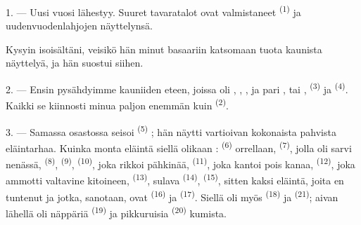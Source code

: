 %
%

\VUsaut{4.0mm}
\VUsaut{2.0mm}
\VUsaut{3.4mm}

1. --- Uusi vuosi lähestyy. Suuret tavaratalot ovat valmistaneet 
\textsuperscript{(1)} ja uudenvuodenlahjojen näyttelynsä.

Kysyin isoisältäni, veisikö hän minut basaariin katsomaan tuota kaunista
näyttelyä, ja hän suostui siihen.

2. --- Ensin pysähdyimme kauniiden  eteen, joissa oli
, , ,  ja
pari , tai , 
\textsuperscript{(3)} ja  \textsuperscript{(4)}. Kaikki se
kiinnosti minua paljon enemmän kuin  \textsuperscript{(2)}.

\VUsaut{3.0mm}
\VUsaut{2.6mm}

3. --- Samassa osastossa seisoi  \textsuperscript{(5)}
; hän näytti vartioivan kokonaista pahvista
eläintarhaa. Kuinka monta eläintä siellä olikaan : 
\textsuperscript{(6)} orrellaan,  \textsuperscript{(7)},
jolla oli sarvi nenässä,  \textsuperscript{(8)},
 \textsuperscript{(9)},  \textsuperscript{(10)},
joka rikkoi pähkinää,  \textsuperscript{(11)}, joka kantoi pois
kanaa,  \textsuperscript{(12)}, joka ammotti valtavine
kitoineen,  \textsuperscript{(13)}, sulava
 \textsuperscript{(14)}, 
\textsuperscript{(15)}, sitten kaksi eläintä, joita en tuntenut ja jotka,
sanotaan, ovat  \textsuperscript{(16)} ja 
\textsuperscript{(17)}. Siellä oli myös 
\textsuperscript{(18)} ja  \textsuperscript{(21)}; aivan lähellä
oli näppäriä  \textsuperscript{(19)} ja pikkuruisia
 \textsuperscript{(20)} kumista.


